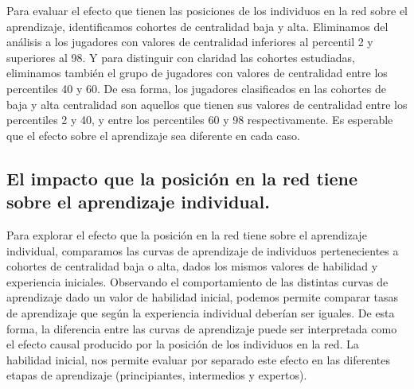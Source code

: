 \documentclass[a4paper,11pt]{book}
\theoremstyle{definition}
\begin{document}

Para evaluar el efecto que tienen las posiciones de los individuos en la red sobre el aprendizaje, identificamos cohortes de centralidad baja y alta.
Eliminamos del an\'alisis a los jugadores con valores de centralidad inferiores al percentil 2 y superiores al 98.
%
Y para distinguir con claridad las cohortes estudiadas, eliminamos tambi\'en el grupo de jugadores con valores de centralidad entre los percentiles 40 y 60.
%
De esa forma, los jugadores clasificados en las cohortes de baja y alta centralidad son aquellos que tienen sus valores de centralidad entre los percentiles 2 y 40, y entre los percentiles 60 y 98 respectivamente.
%
Es esperable que el efecto sobre el aprendizaje sea diferente en cada caso.


\subsection{El impacto que la posici\'on en la red tiene sobre el aprendizaje individual.}



Para explorar el efecto que la posici\'on en la red tiene sobre el aprendizaje individual, comparamos las curvas de aprendizaje de individuos pertenecientes a cohortes de centralidad baja o alta, dados los mismos valores de habilidad y experiencia iniciales.
%
Observando el comportamiento de las distintas curvas de aprendizaje dado un valor de habilidad inicial, podemos permite comparar tasas de aprendizaje que seg\'un la experiencia individual deber\'ian ser iguales.
%
De esta forma, la diferencia entre las curvas de aprendizaje puede ser interpretada como el efecto causal producido por la posici\'on de los individuos en la red.
%
La habilidad inicial, nos permite evaluar por separado este efecto en las diferentes etapas de aprendizaje (principiantes, intermedios y expertos).

\end{document}
